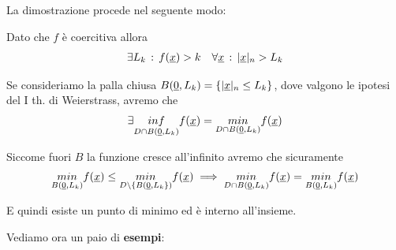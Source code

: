 \bigskip

La dimostrazione procede nel seguente modo:

Dato che $f$ è coercitiva allora 
\begin{align}
	\exists L_k \, : \, f(\underline{x})>k \quad \forall \underline{x} \, : \,|\underline{x}|_n>L_k
\end{align}

Se consideriamo la palla chiusa $B(\underline{0},L_k)=\{|\underline{x}|_n\leq L_k\}$, dove valgono le ipotesi del I th. di Weierstrass, avremo che 
\begin{align}
	\exists \underset{\scriptsize{D \cap B(\underline{0},L_k)}}{inf} f(\underline{x})= \underset{\scriptsize{D \cap B(\underline{0},L_k)}}{min}f(\underline{x})
\end{align}


Siccome fuori $B$ la funzione cresce all'infinito
avremo che sicuramente 
\begin{align}
	\underset{\scriptsize{ B(\underline{0},L_k)}}{min} f(\underline{x}) \leq \underset{\scriptsize{D \backslash \{  B(\underline{0},L_k \} )}}{min} f(\underline{x}) \implies \underset{\scriptsize{D \cap B(\underline{0},L_k)}}{min}f(\underline{x}) = \underset{\scriptsize{ B(\underline{0},L_k)}}{min} f(\underline{x})
\end{align}

E quindi esiste un punto di minimo ed è interno all'insieme.

\newpage

Vediamo ora un paio di \textbf{esempi}:

